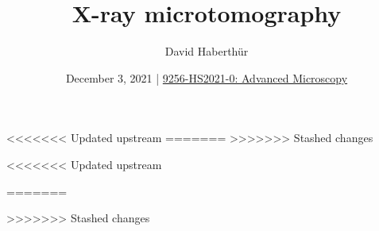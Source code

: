 
\title{X-ray microtomography}
\author{David Haberthür}
\date{December 3, 2021 | \href{https://ilias.unibe.ch/goto_ilias3_unibe_sess_2177953.html}{9256-HS2021-0: Advanced Microscopy}}



<<<<<<< Updated upstream
\newcommand{\everyframe}{333}%
\newcommand{\imwidth}{\linewidth}%
\newcommand{\imheight}{0.618\paperheight}%
\newlength\imagewidth%
=======
\newcommand{\everyframe}{1} %
\newcommand{\imagewidth}{\linewidth}%
\newcommand{\imaheight}{0.8\paperheight}%
>>>>>>> Stashed changes
\newlength\imagescale%
\newcommand{\uct}{{\textmu}CT\xspace}%
\newcommand{\eg}{e.\,g.\xspace}%
\newcommand{\ie}{i.\,e.\xspace}%

\usepackage[backend=biber,
	style=numeric,
	url=false,
	isbn=true,
	maxnames=1,
	sorting=none]{biblatex}
\usepackage{standalone}
\usepackage{tikz}
	\usetikzlibrary{spy}
\usepackage{shadowtext}  %
	\shadowoffset{1pt}
\usepackage{pgfplots}
	\pgfplotsset{compat=newest}
\usepackage[detect-all=true,
	range-phrase=--,
	range-units=single,
	binary-units=true,
	per-mode=symbol,
	per-symbol=/]{siunitx}
\usepackage{microtype}
\usepackage[absolute,overlay]{textpos} %
\usepackage[missing=main]{gitinfo2} %
\usepackage{xspace}
\usepackage{ccicons}
\usepackage[version=4]{mhchem}
\usepackage{animate}
\usepackage{fontawesome5}
\usepackage{csquotes}
\usepackage{listings}
	\lstset{frame=single,
		basicstyle=\tiny\ttfamily
		}
\usepackage{pgfplotstable}
\usepackage{booktabs}
\usepackage{colortbl}
\usepackage{multirow}
<<<<<<< Updated upstream
\usepackage{lipsum}%
\usepackage{datetime2}
=======
\usepackage{lipsum} %
>>>>>>> Stashed changes
\usepackage{mathastext}

